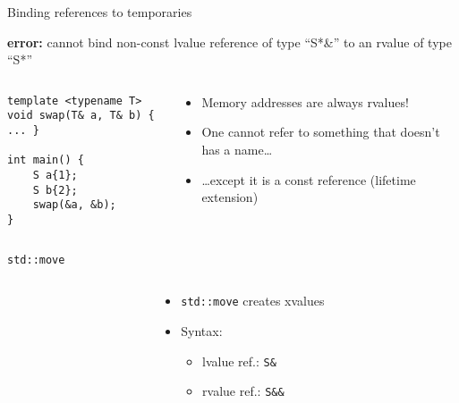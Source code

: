\begin{frame}[fragile]{Binding references to temporaries}
    \begin{center}
        \textbf{\textcolor{vertexDarkRed}{error:}} cannot bind non-const lvalue reference of type \enquote{S*\&} to an rvalue of type \enquote{S*}
    \end{center}
    \begin{columns}
        \begin{column}{.4\textwidth}
            \begin{lstlisting}
template <typename T>
void swap(T& a, T& b) { ... }

int main() {
    S a{1};
    S b{2};
    swap(&a, &b);
}
            \end{lstlisting}
        \end{column}
        \begin{column}{.55\textwidth}
            \begin{itemize}
                \item Memory addresses are always rvalues!
                \item One cannot refer to something that doesn't has a name\ldots
                \item \ldots except it is a const reference (lifetime extension)
            \end{itemize}
        \end{column}
    \end{columns}
\end{frame}

\begin{frame}
    \centering
\end{frame}

\begin{frame}[fragile]{\texttt{std::move}}
    \begin{columns}
        \begin{column}{.55\textwidth}
        \end{column}
        \begin{column}{.4\textwidth}
            \begin{itemize}
                \item \texttt{std::move} creates xvalues
                \item Syntax:
                \begin{itemize}
                    \item lvalue ref.: \texttt{S\&}
                    \item rvalue ref.: \texttt{S\&\&}
                \end{itemize}
            \end{itemize}
        \end{column}
    \end{columns}
\end{frame}

